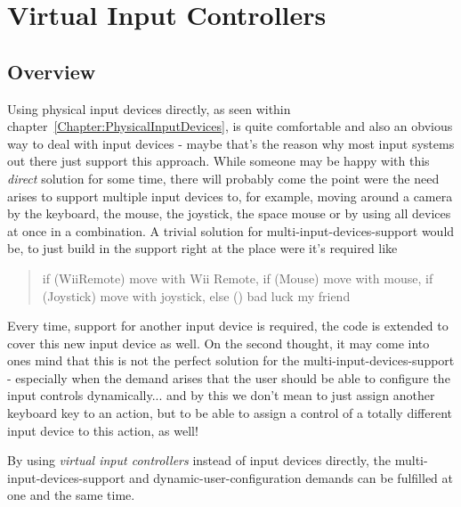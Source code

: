 \chapter{Virtual Input Controllers}




\section{Overview}
Using physical input devices directly, as seen within chapter~\ref{Chapter:PhysicalInputDevices}, is quite comfortable and also an obvious way to deal with input devices - maybe that's the reason why most input systems out there just support this approach. While someone may be happy with this \emph{direct} solution for some time, there will probably come the point were the need arises to support multiple input devices to, for example, moving around a camera by the keyboard, the mouse, the joystick, the space mouse or by using all devices at once in a combination. A trivial solution for multi-input-devices-support would be, to just build in the support right at the place were it's required like
\begin{quote}if (WiiRemote) move with Wii Remote, if (Mouse) move with mouse, if (Joystick) move with joystick, else () bad luck my friend\end{quote}
Every time, support for another input device is required, the code is extended to cover this new input device as well. On the second thought, it may come into ones mind that this is not the perfect solution for the multi-input-devices-support - especially when the demand arises that the user should be able to configure the input controls dynamically... and by this we don't mean to just assign another keyboard key to an action, but to be able to assign a control of a totally different input device to this action, as well!

By using \emph{virtual input controllers} instead of input devices directly, the multi-input-devices-support and dynamic-user-configuration demands can be fulfilled at one and the same time.
